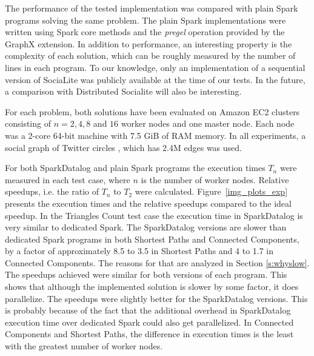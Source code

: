 The performance of the tested implementation was compared with plain Spark programs solving the same problem. The plain Spark implementations were written using Spark core methods and the \emph{pregel} operation provided by the GraphX extension. In addition to performance, an interesting property is the complexity of each solution, which can be roughly measured by the number of lines in each program. To our knowledge, only an implementation of a sequential version of SociaLite was publicly available at the time of our tests. In the future, a comparison with Distributed Socialite will also be interesting.

For each problem, both solutions have been evaluated on Amazon EC2 clusters consisting of $n = 2, 4, 8$ and $16$ worker nodes and one master node. Each node was a 2-core 64-bit machine with 7.5 GiB of RAM memory.  In all experiments, a social graph of Twitter circles \cite{twitterdata}, which has 2.4M edges was used.

For both SparkDatalog and plain Spark programs the execution times $T_n$ were measured in each test case, where $n$ is the number of worker nodes. Relative speedups, i.e. the ratio of $T_n$ to $T_2$ were calculated. Figure~\ref{img_plots_exp} presents the execution times and the relative speedups compared to the ideal speedup. In the Triangles Count test case the execution time in SparkDatalog is very similar to dedicated Spark. The SparkDatalog versions are slower than dedicated Spark programs in both Shortest Paths and Connected Components, by a factor of approximately 8.5 to 3.5 in Shortest Paths and 4 to 1.7 in Connected Components. The reasons for that are analyzed in Section \ref{s:whyslow}. The speedups achieved were similar for both versions of each program. This shows that although the implemented solution is slower by some factor, it does parallelize. The speedups were slightly better for the SparkDatalog versions. This is probably because of the fact that the additional overhead in SparkDatalog execution time over dedicated Spark could also get parallelized. In Connected Components and Shortest Paths, the difference in execution times is the least with the greatest number of worker nodes.


